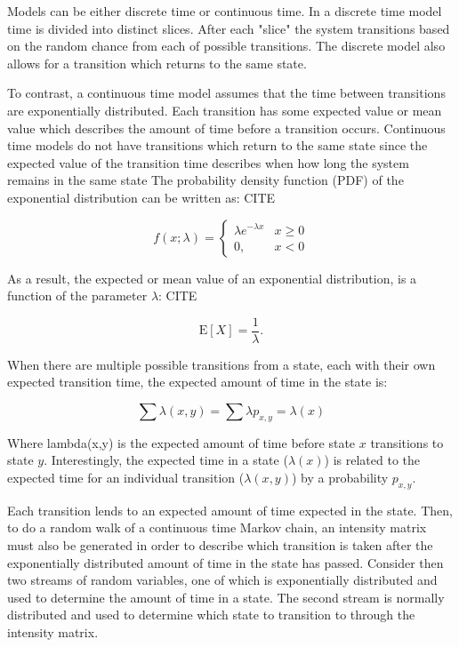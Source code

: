 Models can be either discrete time or continuous time. In a discrete time model
time is divided into distinct slices. After each "slice" the system transitions
based on the random chance from each of possible transitions. The discrete model
also allows for a transition which returns to the same state.

To contrast, a continuous time model assumes that the time between transitions
are exponentially distributed. Each transition has some expected value or mean
value which describes the amount of time before a transition occurs. Continuous
time models do not have transitions which return to the same state since the
expected value of the transition time describes when how long the system 
remains in the same state The probability density
function (PDF) of the exponential distribution can be written as: CITE

\begin{equation}
f(x;\lambda) = \begin{cases}
\lambda e^{-\lambda x} & x \ge 0 \\
0, & x < 0
\end{cases}
\end{equation}

As a result, the expected or mean value of an exponential distribution, is a function of
the parameter $\lambda$: CITE

\begin{equation}
\mathrm{E}[X] = \frac{1}{\lambda}. \!
\end{equation}

When there are multiple possible transitions from a state, each with their own expected transition time, the expected amount of time in the state is:

\begin{equation}
\sum \lambda(x,y) = \sum \lambda p_{x,y} = \lambda(x)
\end{equation}

Where lambda(x,y) is the expected amount of time before state $x$ transitions to state $y$. Interestingly, the expected time in a state ($\lambda(x)$) is related to the expected time for an individual transition ($\lambda(x,y)$) by a probability $p_{x,y}$.

Each transition lends to an expected amount of time expected in the state. Then, to do a random walk of a continuous time Markov chain, an intensity matrix must also be generated in order to describe which transition is taken after the exponentially distributed amount of time in the state has passed. Consider then two streams of random variables, one of which is exponentially distributed and used to determine the amount of time in a state. The second stream is normally distributed and used to determine which state to transition to through the intensity matrix.

